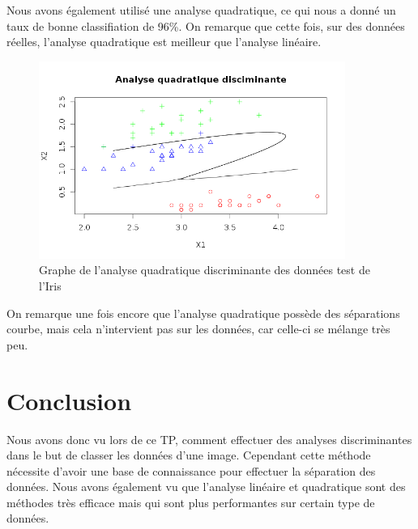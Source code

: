 \documentclass[a4paper,11pt]{article}
\begin{document}
  Nous avons également utilisé une analyse quadratique, ce qui nous a donné un taux de bonne 
  classifiation de 96\%. On remarque que cette fois, sur des données réelles, l'analyse quadratique
  est meilleur que l'analyse linéaire.
  
  \begin{figure}[h]
   \center
   \includegraphics[width=10cm]{iris_quadratique.png}
   \caption{Graphe de l'analyse quadratique discriminante des données test de l'Iris}
  \end{figure}
  
  On remarque une fois encore que l'analyse quadratique possède des séparations courbe,
  mais cela n'intervient pas sur les données, car celle-ci se mélange très peu.
  
  
  \section*{Conclusion}
  Nous avons donc vu lors de ce TP, comment effectuer des analyses discriminantes dans le but
  de classer les données d'une image. Cependant cette méthode nécessite d'avoir une base de connaissance %
  pour effectuer la séparation des données. Nous avons également vu que l'analyse linéaire et quadratique
  sont des méthodes très efficace mais qui sont plus performantes sur certain type de données. 
\end{document}
